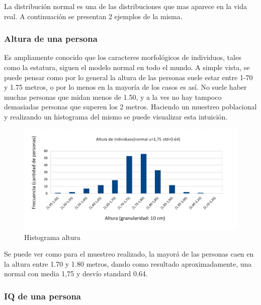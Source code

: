 La distribuci\'on normal es una de las distribuciones que mas aparece en la vida real. A continuaci\'on se presentan 2 ejemplos de la misma.
	
	\subsubsection*{Altura de una persona}
	
		Es ampliamente conocido que los caracteres morfol\'ogicos de individuos, tales como la estatura, siguen el modelo normal en todo el mundo. A simple vista, se puede pensar como por lo general la altura de las personas suele estar entre 1-70 y 1.75 metros, o por lo menos en la mayor\'ia de los casos es as\'i. No suele haber muchas personas que midan menos de 1.50, y a la ves no hay tampoco demasiadas personas que superen los 2 metros. Haciendo un muestreo poblacional y realizando un histograma del mismo se puede visualizar esta intuici\'on.
	
\newpage	
		
\begin{figure}[H]
  \begin{center}
    \includegraphics[scale=.40]{imagenes/normal_ejemplo1.png}
    \caption{Histograma altura} 
    \label{fig:normal_ejemplo1}
  \end{center}
\end{figure}		
		
Se puede ver como para el muestreo realizado, la mayor\'a de las personas caen en la altura entre 1.70 y 1.80 metros, dando como resultado aproximadamente, una normal con media 1,75 y desv\'io standard 0.64.

	\subsubsection*{IQ de una persona}
	
